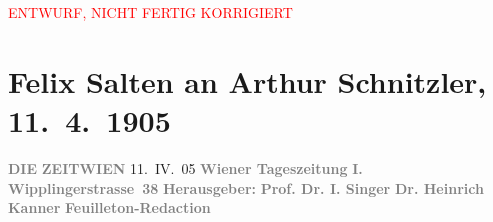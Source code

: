 
\begin{center}
            \textcolor{red}{ENTWURF, NICHT FERTIG KORRIGIERT}
                      \end{center}
            
         
         \renewcommand{\erwaehntePersonen}{Personen: Berta Czegka, Heinrich Kanner, Olga Schnitzler, Isidor Singer}
         \renewcommand{\erwaehnteInstitutionen}{Institutionen: Die Zeit}
         \renewcommand{\erwaehnteOrte}{Orte: Wien, Wipplingerstraße}
         \renewcommand{\erwaehnteWerke}{Werke: Die Zeit, Schiller-Feier, Schiller-Zeit 1805 * 1905, Zum großen Wurstel. Burleske in einem Akt}
               \section[Felix Salten an Arthur Schnitzler, 11. 4. 1905]{ Felix Salten an Arthur Schnitzler, 11. 4. 1905}\nopagebreak{}\rehead{ }\begin{ledgroupsized}[t]{13cm}\normalsize\beginnumbering \toendnotes[C]{\smallbreak\pagebreak[2]} 
\toendnotes[C]{\smallbreak}\pstart
           \noindent{}{\pb}\textcolor{gray}{\textbf{DIE}}\pend
           \pstart
           \textcolor{gray}{\textbf{ZEIT}}\hfill \textcolor{gray}{\textbf{WIEN}}{ }11. IV. 05\pend
           \pstart
           \textcolor{gray}{\textbf{Wiener Tageszeitung }}\hfill \textcolor{gray}{\textbf{I. Wipplingerstrasse 38}}\pend
           \pstart
           \textcolor{gray}{\textbf{Herausgeber: }}\pend
           \pstart
           \textcolor{gray}{\textbf{Prof. Dr. I. Singer}}\pend
           \pstart
           \textcolor{gray}{\textbf{Dr. Heinrich Kanner}}\pend
           \pstart
           \textcolor{gray}{\textbf{Feuilleton-Redaction}}\pend
           \pstart

\end{ledgroupsized}
